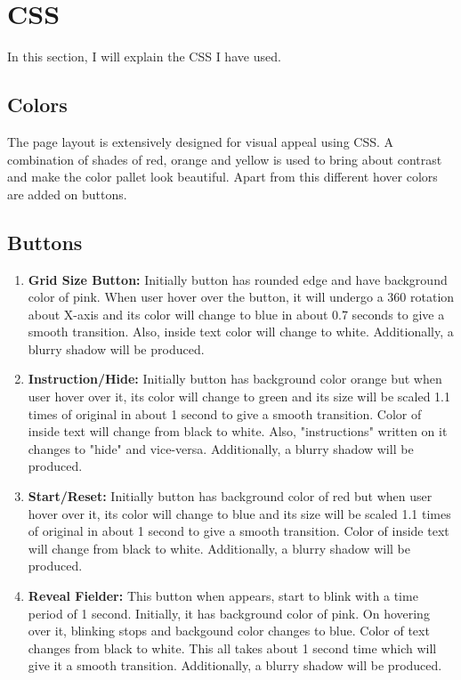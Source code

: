 \documentclass{article}
\begin{document}
\section{CSS}
In this section, I will explain the CSS I have used. \autocite{2}
\subsection{Colors}
The page layout is extensively designed for visual appeal using CSS. A combination of shades of red, orange and yellow is used to bring about contrast and make the color pallet look beautiful. Apart from this different hover colors are added on buttons.
\subsection{Buttons}
\begin{enumerate}
\item {\bfseries Grid Size Button:} Initially button has rounded edge and have background color of pink. When user hover over the button, it will undergo a 360\textdegree{} rotation about X-axis and its color will change to blue in about 0.7 seconds to give a smooth transition. Also, inside text color will change to white. Additionally, a blurry shadow will be produced.
\item {\bfseries Instruction/Hide:} Initially button has background color orange but when user hover over it, its color will change to green and its size will be scaled 1.1 times of original in about 1 second to give a smooth transition. Color of inside text will change from black to white. Also, "instructions" written on it changes to "hide" and vice-versa. Additionally, a blurry shadow will be produced.
\item {\bfseries Start/Reset:} Initially button has background color of red but when user hover over it, its color will change to blue and its size will be scaled 1.1 times of original in about 1 second to give a smooth transition. Color of inside text will change from black to white.  Additionally, a blurry shadow will be produced.
\item {\bfseries Reveal Fielder:} This button when appears, start to blink with a time period of 1 second. Initially, it has background color of pink. On hovering over it, blinking stops and backgound color changes to blue. Color of text changes from black to white. This all takes about 1 second time which will give it a smooth transition. Additionally, a blurry shadow will be produced.
\end{enumerate}
\end{document}
